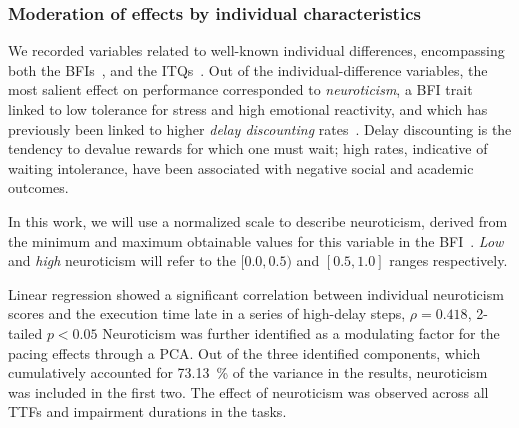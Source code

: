 \subsubsection{Moderation of effects by individual characteristics}\label{ssec:moderationeffects}

We recorded variables related to well-known individual differences, encompassing both the \glspl{BFI}~\cite{oliver:bfi1999}, and the \glspl{ITQ}~\cite{witmer1998measuring}.
Out of the individual-difference variables, the most salient effect on performance corresponded to \emph{neuroticism}, a \gls{BFI} trait linked to low tolerance for stress and high emotional reactivity, and which has previously been linked to higher \emph{delay discounting} rates~\cite{hirsh2008delay}.
Delay discounting is the tendency to devalue rewards for which one must wait; high rates, indicative of waiting intolerance, have been associated with negative social and academic outcomes.


In this work, we will use a normalized scale to describe neuroticism, derived from the minimum and maximum obtainable values for this variable in the \gls{BFI}~\cite{oliver:bfi1999}.
\emph{Low} and \emph{high} neuroticism will refer to the \( [0.0, 0.5) \) and \( [0.5, 1.0] \) ranges respectively.

Linear regression showed a significant correlation between individual neuroticism scores and the execution time late in a series of high-delay steps, \( \rho = 0.418 \), \num{2}-tailed \( p < 0.05 \)
Neuroticism was further identified as a modulating factor for the pacing effects through a \gls{PCA}.
Out of the three identified components, which cumulatively accounted for \SI{73.13}{\percent} of the variance in the results, neuroticism was included in the first two.
The effect of neuroticism was observed across all \glspl{TTF} and impairment durations in the tasks.


